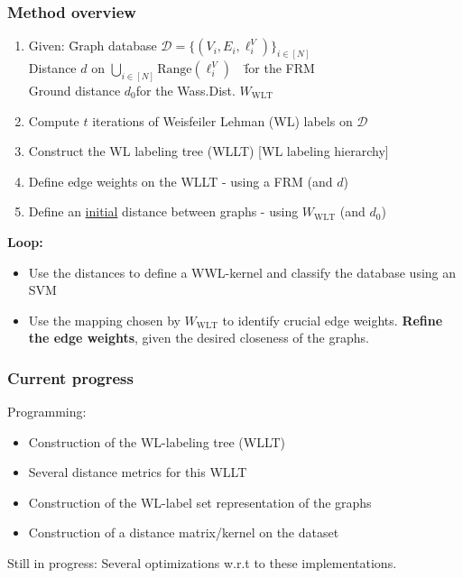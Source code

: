 \begin{frame}
\frametitle{Method overview} \vspace{-1cm}
\begin{enumerate}
	\item \begin{tabbing}
		Given: \=Graph database $\mathcal{D}=\{ (V_i, E_i, \ell^V_i) \}_{i\in[N]}$\\
		\>Distance $d$ on $\bigcup_{i\in[N]}\text{Range}(\ell^V_i)$\ \ \=for the FRM\\
		\>Ground distance $d_0$\>for the Wass.Dist. $W_{\text{WLT}}$
	\end{tabbing}
	\item Compute $t$ iterations of Weisfeiler Lehman (WL) labels on $\mathcal{D}$
	\item Construct the WL labeling tree (WLLT) [WL labeling hierarchy]
	\item Define edge weights on the WLLT - using a FRM (and $d$)		
	\item Define an \underline{initial} distance between graphs - using $W_{\text{WLT}}$ (and $d_0$)
\end{enumerate}
\textbf{Loop:}
\begin{itemize}		
	\item Use the distances to define a WWL-kernel and classify the database using an SVM
	\item Use the mapping chosen by $W_{\text{WLT}}$ to identify crucial edge weights. \textbf{Refine the edge weights}, given the desired closeness of the graphs.
\end{itemize}
\end{frame}

\begin{frame}
\frametitle{Current progress}
	Programming:
	\begin{itemize}
		\item Construction of the WL-labeling tree (WLLT) \newline
		\item Several distance metrics for this WLLT \newline
		\item Construction of the WL-label set representation of the graphs \newline
		\item Construction of a distance matrix/kernel on the dataset\newline
	\end{itemize}	
	Still in progress: Several optimizations w.r.t to these implementations.
\end{frame}

